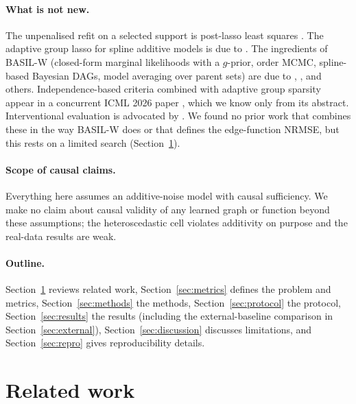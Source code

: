 \documentclass[11pt,a4paper]{article}
\begin{document}
\paragraph{What is not new.} The unpenalised refit on a selected support is post-lasso least squares \citep{belloni2013}. The adaptive group lasso for spline additive models is due to \citet{huang2010}. The ingredients of BASIL-W (closed-form marginal likelihoods with a $g$-prior, order MCMC, spline-based Bayesian DAGs, model averaging over parent sets) are due to \citet{friedman2003}, \citet{ni2015}, \citet{toth2025} and others. Independence-based criteria combined with adaptive group sparsity appear in a concurrent ICML 2026 paper \citep{yao2026}, which we know only from its abstract. Interventional evaluation is advocated by \citet{gentzel2019}. We found no prior work that combines these in the way BASIL-W does or that defines the edge-function NRMSE, but this rests on a limited search (Section~\ref{sec:related}).

\paragraph{Scope of causal claims.} Everything here assumes an additive-noise model with causal sufficiency. We make no claim about causal validity of any learned graph or function beyond these assumptions; the heteroscedastic cell violates additivity on purpose and the real-data results are weak.

\paragraph{Outline.} Section~\ref{sec:related} reviews related work, Section~\ref{sec:metrics} defines the problem and metrics, Section~\ref{sec:methods} the methods, Section~\ref{sec:protocol} the protocol, Section~\ref{sec:results} the results (including the external-baseline comparison in Section~\ref{sec:external}), Section~\ref{sec:discussion} discusses limitations, and Section~\ref{sec:repro} gives reproducibility details.

\section{Related work}
\label{sec:related}
\end{document}
